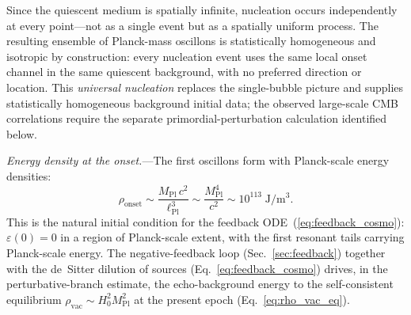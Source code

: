 \documentclass[aps,prd,onecolumn,superscriptaddress,nofootinbib,showpacs,12pt,notitlepage]{revtex4-2}
\newcommand{\Mpl}{M_{\mathrm{Pl}}}
\begin{document}
Since the quiescent medium is spatially infinite,
nucleation occurs independently at every point---not
as a single event but as a spatially uniform process.
The resulting ensemble of Planck-mass oscillons is
statistically homogeneous and isotropic by construction:
every nucleation event uses the same local onset channel
in the same quiescent background, with no preferred
direction or location.  This \emph{universal nucleation}
replaces the single-bubble picture and supplies
statistically homogeneous background initial data; the
observed large-scale CMB correlations require the
separate primordial-perturbation calculation identified
below.

\textit{Energy density at the onset.}---The first
oscillons form with Planck-scale energy densities:
\begin{equation}\label{eq:rho_onset}
  \rho_{\mathrm{onset}}
  \sim \frac{\Mpl\,c^2}{\ell_{\mathrm{Pl}}^3}
  \sim \frac{\Mpl^4}{c^2}
  \sim 10^{113}\;\mathrm{J/m^3}.
\end{equation}
This is the natural initial condition for the feedback
ODE~(\ref{eq:feedback_cosmo}): $\varepsilon(0) = 0$
in a region of Planck-scale extent, with the first
resonant tails carrying Planck-scale energy.  The
negative-feedback loop (Sec.~\ref{sec:feedback}) together
with the de~Sitter dilution of sources
(Eq.~\ref{eq:feedback_cosmo}) drives, in the
perturbative-branch estimate, the echo-background energy to
the self-consistent equilibrium
$\rho_{\mathrm{vac}} \sim H_0^2 \Mpl^2$ at the
present epoch (Eq.~\ref{eq:rho_vac_eq}).
\end{document}
